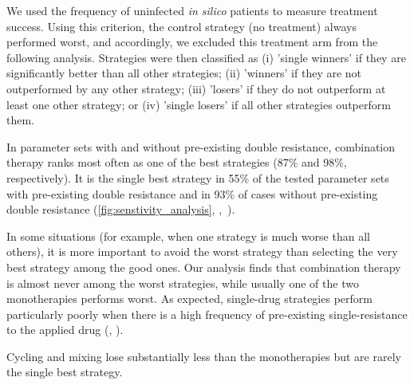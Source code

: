 We used the frequency of uninfected \textit{in silico} patients to measure treatment success. 
Using this criterion, the control strategy (no treatment) always performed worst, and accordingly, we excluded this treatment arm from the following analysis.
Strategies were then classified as (i) 'single winners' if they are significantly better than all other strategies; (ii) 'winners' if they are not outperformed by any other strategy; (iii) 'losers' if they do not outperform at least one other strategy; or (iv) 'single losers' if all other strategies outperform them.

In parameter sets with and without pre-existing double resistance, combination therapy ranks most often as one of the best strategies (87\%  and 98\%, respectively). 
It is the single best strategy in 55\% of the tested parameter sets with pre-existing double resistance and in 93\% of cases without pre-existing double resistance (\autoref{fig:senstivity_analysis}, ,~). 

In some situations (for example, when one strategy is much worse than all others), it is more important to avoid the worst strategy than selecting the very best strategy among the good ones. 
Our analysis finds that combination therapy is almost never among the worst strategies, while usually one of the two monotherapies performs worst.
As expected, single-drug strategies perform particularly poorly when there is a high frequency of pre-existing single-resistance to the applied drug (, ).

Cycling and mixing lose substantially less than the monotherapies but are rarely the single best strategy. 

